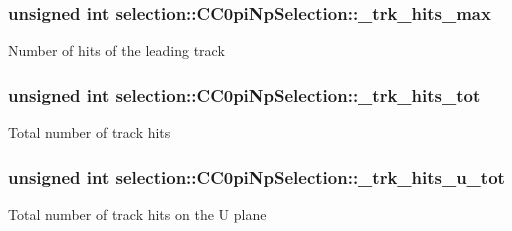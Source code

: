 \subsubsection[{\texorpdfstring{\+\_\+trk\+\_\+hits\+\_\+max}{_trk_hits_max}}]{\setlength{\rightskip}{0pt plus 5cm}unsigned int selection\+::\+C\+C0pi\+Np\+Selection\+::\+\_\+trk\+\_\+hits\+\_\+max\hspace{0.3cm}{\ttfamily [private]}}\hypertarget{classselection_1_1CC0piNpSelection_a247d186cb641d28f8ea5b02c4f2a39bc}{}\label{classselection_1_1CC0piNpSelection_a247d186cb641d28f8ea5b02c4f2a39bc}
Number of hits of the leading track 
\subsubsection[{\texorpdfstring{\+\_\+trk\+\_\+hits\+\_\+tot}{_trk_hits_tot}}]{\setlength{\rightskip}{0pt plus 5cm}unsigned int selection\+::\+C\+C0pi\+Np\+Selection\+::\+\_\+trk\+\_\+hits\+\_\+tot\hspace{0.3cm}{\ttfamily [private]}}\hypertarget{classselection_1_1CC0piNpSelection_a420b9962478d7998282e03f1ccf89c2e}{}\label{classselection_1_1CC0piNpSelection_a420b9962478d7998282e03f1ccf89c2e}
Total number of track hits 
\subsubsection[{\texorpdfstring{\+\_\+trk\+\_\+hits\+\_\+u\+\_\+tot}{_trk_hits_u_tot}}]{\setlength{\rightskip}{0pt plus 5cm}unsigned int selection\+::\+C\+C0pi\+Np\+Selection\+::\+\_\+trk\+\_\+hits\+\_\+u\+\_\+tot\hspace{0.3cm}{\ttfamily [private]}}\hypertarget{classselection_1_1CC0piNpSelection_af7d0e867df8901ff3e531b4c1b96408a}{}\label{classselection_1_1CC0piNpSelection_af7d0e867df8901ff3e531b4c1b96408a}
Total number of track hits on the U plane 
